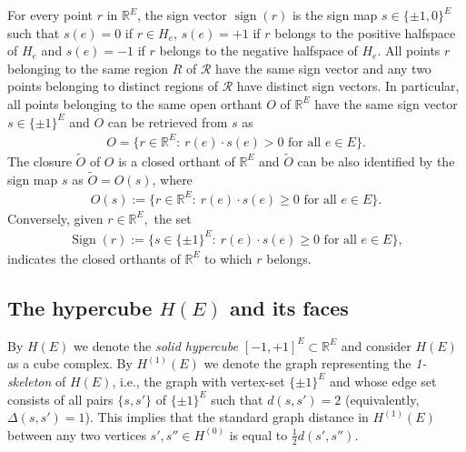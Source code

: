 \documentclass[11pt,a4paper]{amsart}
\theoremstyle{definition}
\numberwithin{equation}{section}
\DeclareMathOperator{\sign}{sign}
\DeclareMathOperator{\Sign}{Sign}
\newcommand{\HH}{\ensuremath{H}}
\newcommand{\OO}{\ensuremath{{O}}}
\begin{document}
For every point $r$ in ${\mathbb R}^E$, the sign vector $\sign(r)$  is the sign map
$s\in \{ \pm 1,0\}^E$ such that $s(e)=0$ if $r\in H_e$, $s(e)=+1$ if $r$ belongs to the positive halfspace of $H_e$ and $s(e)=-1$ if $r$ belongs to the negative halfspace of $H_e$. All points $r$ belonging to the same region $R$ of ${\mathcal R}$ have the same sign vector and any two points belonging to distinct regions of ${\mathcal R}$ have distinct sign vectors. In particular, all points belonging to the same open orthant $\OO$ of ${\mathbb R}^E$ have the same sign vector
$s\in \{ \pm 1\}^E$ and $\OO$ can be retrieved from $s$ as %
\begin{align*}
\OO=\{ r\in {\mathbb R}^E: ~r(e)\cdot s(e)>0  \mbox{ for all } e\in E\}.
\end{align*}
The closure $\widetilde{\OO}$ of $\OO$ is a closed orthant of ${\mathbb R}^E$ and $\widetilde{\OO}$ can be also identified by the sign map $s$ as $\widetilde{\OO}=\OO(s)$, where
\begin{align*}
\OO(s):=\{ r\in {\mathbb R}^E: ~r(e)\cdot s(e)\ge 0  \mbox{ for all } e\in E\}.
\end{align*}
Conversely, given $r\in {\mathbb R}^E,$ the set
\begin{align*}
\Sign(r):=\{ s\in \{ \pm 1\}^E: ~r(e)\cdot s(e)\ge 0 \mbox{ for all } e\in E\},
\end{align*}
indicates the closed orthants of ${\mathbb R}^E$ to which $r$ belongs.


\subsection{The hypercube $\HH(E)$ and  its faces} By $\HH(E)$ we denote the \emph{solid hypercube} $[-1,+1]^E\subset {\mathbb R}^E$ and consider $\HH(E)$ as a cube complex. By $H^{(1)}(E)$ we denote the graph representing the \emph{1-skeleton} of $\HH(E)$, i.e., the graph with vertex-set
$\{ \pm 1\}^E$  and whose edge set consists of all pairs $\{ s,s'\}$ of $\{ \pm 1\}^E$ such that $d(s,s')=2$ (equivalently, $\Delta(s,s')=1$). This implies that  the standard graph distance  in $H^{(1)}(E)$ between any two vertices $s',s''\in \HH^{(0)}$ is equal to $\frac{1}{2}d(s',s'')$.
\end{document}
